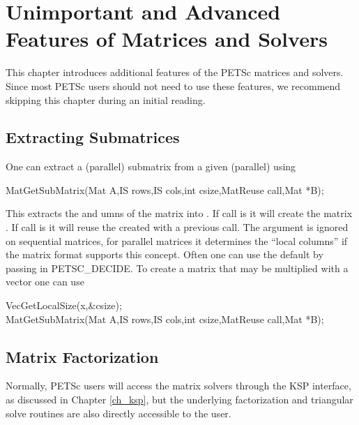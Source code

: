 {{{%

\cleardoublepage
\chapter{Unimportant and Advanced Features of Matrices and Solvers}
\label{ch_advanced}

This chapter introduces additional features of the PETSc matrices and solvers.
Since most PETSc users should not need to use these features, 
we recommend skipping this chapter during an initial reading.

\medskip \medskip

\section{Extracting Submatrices} 

One can extract a (parallel) submatrix from a given (parallel) using
\begin{tabbing}
  MatGetSubMatrix(Mat A,IS rows,IS cols,int csize,MatReuse call,Mat *B);
\end{tabbing}
This extracts the  and umns of the matrix  into . If 
call is    it will create the matrix
. If call is   it will reuse the 
created with a previous call.  The argument  is ignored 
on sequential matrices, for parallel matrices it determines the ``local columns'' if the matrix
format supports this concept. Often one can use the default by passing in PETSC\_DECIDE.
To create a  matrix that may be multiplied with a vector  one can use
\begin{tabbing}
  VecGetLocalSize(x,\&csize);\\
  MatGetSubMatrix(Mat A,IS rows,IS cols,int csize,MatReuse call,Mat *B);
\end{tabbing}


\medskip \medskip

\section{Matrix Factorization} 
\label{sec_matfactor}

Normally, PETSc users will access the matrix solvers through the 
KSP interface, as discussed in Chapter \ref{ch_ksp}, but the underlying 
factorization and triangular solve routines are also directly 
accessible to the user.

}}}
